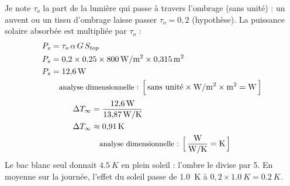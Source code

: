 \begin{demonstration}
Je note $\tau_o$ la part de la lumière qui passe à travers l'ombrage (sans unité) : un auvent ou un tissu d'ombrage laisse passer $\tau_o = 0{,}2$ (hypothèse). La puissance solaire absorbée est multipliée par $\tau_o$ :
\begin{align*}
P_s &= \tau_o\,\alpha\,G\,S_{top}\\
P_s &= 0{,}2 \times 0{,}25 \times \qty{800}{W/m^2} \times \qty{0,315}{m^2}\\
P_s &= \qty{12,6}{W}\\
\dimline{\text{sans unité}\times\unit{W/m^2}\times\unit{m^2}=\unit{W}}
\end{align*}
\begin{align*}
\Delta T_{\infty} &= \frac{\qty{12,6}{W}}{\qty{13,87}{W/K}}\\
\Delta T_{\infty} &\approx \qty{0,91}{K}\\
\dimline{\dfrac{\unit{W}}{\unit{W/K}}=\unit{K}}
\end{align*}
Le bac blanc seul donnait $\qty{4,5}{K}$ en plein soleil : l'ombre le divise par 5. En moyenne sur la journée, l'effet du soleil passe de \qty{1,0}{K} à $0{,}2 \times \qty{1,0}{K} = \qty{0,2}{K}$.
\end{demonstration}

